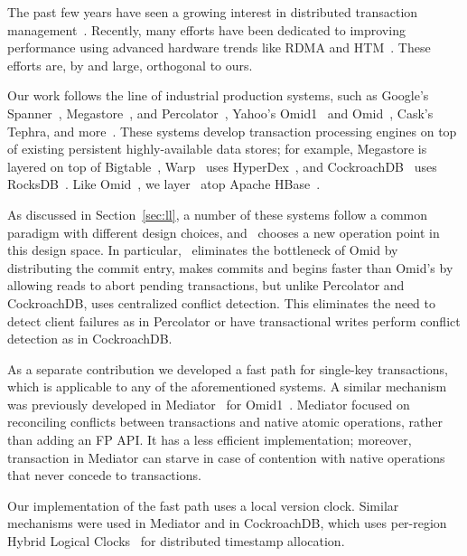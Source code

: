 

The past few years have seen a growing interest in distributed 
transaction management~\cite{PattersonENAA12,Cowling2012,Aguilera2015,Balakrishnan2013,Thomson2012,eyal2013ordering,Warp}.
Recently, many efforts have been dedicated to improving performance using advanced 
hardware trends like RDMA and HTM~\cite{Wei2015,Dragojevic2014,Dragojevic2015}.  
These efforts are, by and large, orthogonal to ours.

Our work follows the line of industrial production systems, such as 
Google's Spanner~\cite{Spanner2012}, Megastore~\cite{Megastore}, and Percolator~\cite{Percolator2010}, 
Yahoo's Omid1~\cite{OmidICDE2014} and Omid~\cite{Omid2017}, 
Cask's Tephra\cite{tephra}, and more~\cite{cockroach}.
These systems develop transaction processing engines on top of existing persistent 
highly-available data stores; for example, Megastore is layered on top of
Bigtable~\cite{Chang2008}, Warp~\cite{Warp} uses HyperDex~\cite{Escriva2012}, 
and CockroachDB~\cite{cockroach} uses RocksDB~\cite{rocksdb}.
Like  Omid~\cite{Omid2017}, we layer \sys\ atop Apache HBase~\cite{hbase}.

As discussed in Section~\ref{sec:ll}, a number of these systems follow a common paradigm
with different design choices, and \sys\ chooses a new operation point in 
this design space. In particular, \sys\ eliminates the bottleneck of Omid by
distributing the commit entry, makes commits and begins faster than Omid's by 
allowing reads to abort pending transactions, but unlike Percolator and CockroachDB, 
uses centralized conflict detection. This eliminates the need to detect client 
failures as in Percolator or have transactional writes perform conflict detection 
as in CockroachDB. 

As a separate contribution we developed a fast path for single-key transactions,
which is applicable to any of the aforementioned systems. A similar mechanism 
was previously developed in Mediator~\cite{mediator} for Omid1~\cite{OmidICDE2014}. 
Mediator focused on reconciling conflicts between transactions and native atomic operations, 
rather than adding an FP API. It has a less efficient implementation; moreover, 
transaction in Mediator can starve in case of contention with native operations
that never concede to transactions.

Our implementation of the fast path uses a local version clock. Similar mechanisms
were used in Mediator and in CockroachDB, which uses 
per-region Hybrid Logical Clocks~\cite{Kulkarni2014LogicalPC} for distributed timestamp allocation. 

